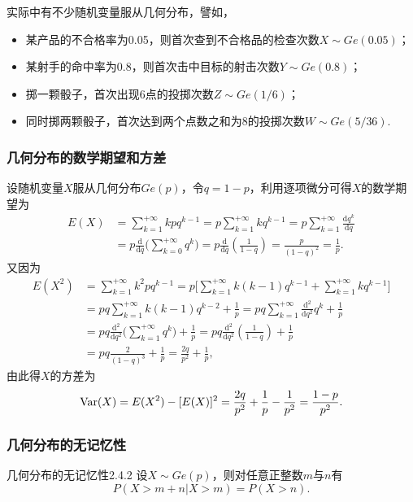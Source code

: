实际中有不少随机变量服从几何分布，譬如，

\begin{itemize}
  \item 某产品的不合格率为0.05，则首次查到不合格品的检查次数$X\sim Ge(0.05)$；

  \item 某射手的命中率为0.8，则首次击中目标的射击次数$Y\sim Ge(0.8)$；

  \item 掷一颗骰子，首次出现6点的投掷次数$Z\sim Ge(1/6)$；

  \item 同时掷两颗骰子，首次达到两个点数之和为8的投掷次数$W\sim Ge(5/36)$.
\end{itemize}

\subsubsection{几何分布的数学期望和方差}
设随机变量$X$服从几何分布$Ge(p)$，令$q=1-p$，利用逐项微分可得$X$的数学期望为
\begin{align*}
  E(X) & = \sum_{k=1}^{+\infty} kpq^{k-1} = p\sum_{k=1}^{+\infty}kq^{k-1} = p\sum_{k=1}^{+\infty}\frac{\mathrm dq^k}{\mathrm dq} \\
  & = p\frac{\mathrm d}{\mathrm dq}\Big( \sum_{k=0}^{+\infty}q^k \Big) = p \frac{\mathrm d}{\mathrm dq}\left( \frac1{1-q} \right) =
  \frac p{(1-q)^2} = \frac1p.
\end{align*}
又因为
\begin{align*}
  E(X^2) & = \sum_{k=1}^{+\infty} k^2pq^{k-1} = p
  \bigg[ \sum_{k=1}^{+\infty} k(k-1)q^{k-1} + \sum_{k=1}^{+\infty} kq^{k-1} \bigg] \\
  & = pq\sum_{k=1}^{+\infty} k(k-1)q^{k-2} + \frac1p = pq \sum_{k=1}^{+\infty}\frac{\mathrm d^2}{\mathrm dq^2}q^k + \frac1p \\
  & = pq\frac{\mathrm d^2}{\mathrm dq^2}\Big(\sum_{k=1}^{+\infty}q^k\big) + \frac1p
    = pq \frac{\mathrm d^2}{\mathrm dq^2}\left( \frac1{1-q}\right) + \frac1p \\
  & = pq\frac2{(1-q)^3} + \frac1p = \frac{2q}{p^2} + \frac1p,
\end{align*}
由此得$X$的方差为
\[
  \operatorname{Var}(X) = E(X^2) - [E(X)]^2 = \frac{2q}{p^2} + \frac1p - \frac1{p^2} = \frac{1-p}{p^2}.
\]

\subsubsection{几何分布的无记忆性}
\begin{theorem}{几何分布的无记忆性}{2.4.2}
  设$X\sim Ge(p)$，则对任意正整数$m$与$n$有
  \begin{equation}\label{eq2.4.9}
    P(X > m + n| X > m) = P(X > n).
  \end{equation}
\end{theorem}

